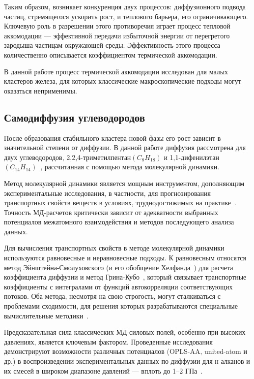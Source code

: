 Таким образом, возникает конкуренция двух процессов: диффузионного подвода частиц, стремящегося ускорить рост, и теплового барьера, его ограничивающего. Ключевую роль в разрешении этого противоречия играет процесс тепловой аккомодации — эффективной передачи избыточной энергии от перегретого зародыша частицам окружающей среды. Эффективность этого процесса количественно описывается коэффициентом термической аккомодации.

В данной работе процесс термической аккомодации исследован для малых кластеров железа, для которых классические макроскопические подходы могут оказаться неприменимы.

\subsection{Самодиффузия углеводородов}

После образования стабильного кластера новой фазы его рост зависит в значительной степени от диффузии. В данной работе диффузия рассмотрена для двух углеводородов, 2,2,4-триметилпентан$(C_8H_{18})$ и 1,1-дифенилэтан$(C_{14}H_{14})$~\cite{kim_correlation_2020}, рассчитанная с помощью метода молекулярной динамики.

Метод молекулярной динамики является мощным инструментом, дополняющим экспериментальные исследования, в частности, для прогнозирования транспортных свойств веществ в условиях, труднодостижимых на практике~\cite{brazhkin2018, ewen_advances_2018, maginn_best_2018}. Точность МД-расчетов критически зависит от адекватности выбранных потенциалов межатомного взаимодействия и методов последующего анализа данных.

Для вычисления транспортных свойств в методе молекулярной динамики используются равновесные и неравновесные подходы. К равновесным относятся метод Эйнштейна-Смолуховского (и его обобщение Хелфанда~\cite{helfand_transport_1960}) для расчета коэффициента диффузии и метод Грина-Кубо~\cite{green_markoff_1954, kubo_statistical-mechanical_1957}, который связывает транспортные коэффициенты с интегралами от функций автокорреляции соответствующих потоков. Оба метода, несмотря на свою строгость, могут сталкиваться с проблемами сходимости, для решения которых разрабатываются специальные вычислительные методики~\cite{kondratyuk_self-consistent_2016, zhang_reliable_2015, nichols_fourier_2015}.
 
Предсказательная сила классических МД-силовых полей, особенно при высоких давлениях, является ключевым фактором. Проведенные исследования демонстрируют возможности различных потенциалов (OPLS-AA, united-atom и др.) в воспроизведении экспериментальных данных по диффузии для н-алканов и их смесей в широком диапазоне давлений — вплоть до 1–2 ГПа~\cite{jadhao_2017, jadhao_2019, maginn_best_2018, feng_md_2013, prentice_experimental_2020, ewen_comparison_2016, glova_toward_2019, santos_self-diffusion_2019}.

